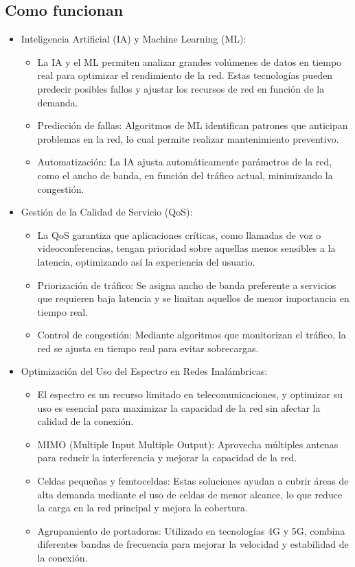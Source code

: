 \documentclass[12pt]{article}
\begin{document}
\subsection{Como funcionan}
\begin{itemize}
    \item Inteligencia Artificial (IA) y Machine Learning (ML):
    \begin{itemize}
        \item La IA y el ML permiten analizar grandes volúmenes de datos en tiempo real para optimizar el rendimiento de la red. Estas tecnologías 
        pueden predecir posibles fallos y ajustar los recursos de red en función de la demanda.
        \item Predicción de fallas: Algoritmos de ML identifican patrones que anticipan problemas en la red, lo cual permite realizar mantenimiento 
        preventivo.
        \item Automatización: La IA ajusta automáticamente parámetros de la red, como el ancho de banda, en función del tráfico actual, 
        minimizando la congestión. 
    \end{itemize}

    \item Gestión de la Calidad de Servicio (QoS):
    \begin{itemize}
        \item La QoS garantiza que aplicaciones críticas, como llamadas de voz o videoconferencias, tengan prioridad sobre aquellas menos 
        sensibles a la latencia, optimizando así la experiencia del usuario.
        \item Priorización de tráfico: Se asigna ancho de banda preferente a servicios que requieren baja latencia y se limitan aquellos de
        menor importancia en tiempo real.
        \item Control de congestión: Mediante algoritmos que monitorizan el tráfico, la red se ajusta en tiempo real para evitar sobrecargas.
    \end{itemize}


    \item Optimización del Uso del Espectro en Redes Inalámbricas:
    \begin{itemize}
        \item El espectro es un recurso limitado en telecomunicaciones, y optimizar su uso es esencial para maximizar la capacidad de la red 
        sin afectar la calidad de la conexión.
        \item MIMO (Multiple Input Multiple Output): Aprovecha múltiples antenas para reducir la interferencia y mejorar la capacidad de la red.
        \item Celdas pequeñas y femtoceldas: Estas soluciones ayudan a cubrir áreas de alta demanda mediante el uso de celdas de menor alcance, 
        lo que reduce la carga en la red principal y mejora la cobertura.
        \item Agrupamiento de portadoras: Utilizado en tecnologías 4G y 5G, combina diferentes bandas de frecuencia para mejorar la velocidad 
        y estabilidad de la conexión.
    \end{itemize}


\end{itemize}
\end{document}
